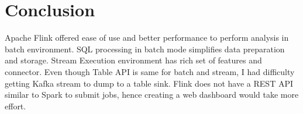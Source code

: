 \documentclass{sig-alternate-05-2015}
\begin{document}
\break
\break
\break
\break
\break

\section {Conclusion}
Apache Flink offered ease of use and better performance to perform analysis in batch environment. SQL processing in batch mode simplifies data preparation and storage.
\break
Stream Execution environment has rich set of features and connector. Even though Table API is same for batch and stream, I had difficulty getting Kafka stream to dump to a table sink.   
\break
Flink does not have a REST API similar to Spark to submit jobs, hence creating a web dashboard would take more effort.
\end{document}

